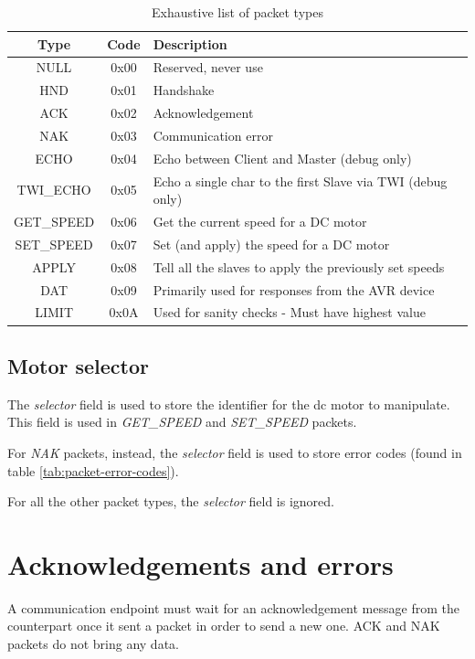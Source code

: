 \documentclass[binding=0.6cm,Lau]{sapthesis}
\begin{document}
\begin{table}[bh]
  \begin{tabularx}{\textwidth}{c c X}
    \toprule
    Type & Code & Description \\
    \midrule
    NULL       & 0x00 & Reserved, never use \\
    HND        & 0x01 & Handshake \\
    ACK        & 0x02 & Acknowledgement \\
    NAK        & 0x03 & Communication error \\
    ECHO       & 0x04 & Echo between Client and Master (debug only)\\
    TWI\_ECHO  & 0x05 & Echo a single char to the first Slave via TWI (debug only)\\
    GET\_SPEED & 0x06 & Get the current speed for a DC motor \\
    SET\_SPEED & 0x07 & Set (and apply) the speed for a DC motor \\
    APPLY      & 0x08 & Tell all the slaves to apply the previously set speeds \\
    DAT        & 0x09 & Primarily used for responses from the AVR device \\
    LIMIT      & 0x0A & Used for sanity checks - Must have highest value \\
    \bottomrule
  \end{tabularx}
  \caption{Exhaustive list of packet types}
  \label{tab:packet-types}
\end{table}

\subsection{Motor selector}
The \emph{selector} field is used to store the identifier for the dc motor to
manipulate. This field is used in \emph{GET\_SPEED} and \emph{SET\_SPEED} packets.

For \emph{NAK} packets, instead, the \emph{selector} field is used to store
error codes (found in table \ref{tab:packet-error-codes}).

For all the other packet types, the \emph{selector} field is ignored.

\section{Acknowledgements and errors}
A communication endpoint must wait for an acknowledgement message from the
counterpart once it sent a packet in order to send a new one. ACK and NAK
packets do not bring any data.
\end{document}
